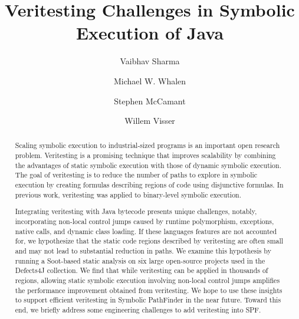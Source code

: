 \documentclass[sigconf]{acmart}
\begin{document}
\title{Veritesting Challenges in Symbolic Execution of Java}
\author{Vaibhav Sharma}

\author{Michael W. Whalen}

\author{Stephen McCamant}

\author{Willem Visser}
\renewcommand{\shortauthors}{V. Sharma et al.}


\begin{abstract}
Scaling symbolic execution to industrial-sized programs is an important open research problem.
%
Veritesting is a promising technique that improves scalability by combining the advantages of static symbolic execution with those of dynamic symbolic execution.  The goal of veritesting is to reduce the number of paths to explore in symbolic execution by creating formulas describing regions of code using disjunctive formulas.
%
In previous work, veritesting was applied to binary-level symbolic execution.

Integrating veritesting with Java bytecode presents unique challenges,
notably, incorporating non-local control jumps caused by runtime polymorphism, exceptions, native calls, and dynamic class loading.
%
If these languages features are not accounted for, we hypothesize that the static code regions described by veritesting are often small and may not lead to substantial reduction in paths.  We examine this hypothesis by running a Soot-based static analysis on six large open-source projects used in the Defects4J collection.
%
We find that while veritesting can be applied in thousands of regions, allowing static symbolic execution involving non-local control jumps amplifies the performance improvement obtained from veritesting.
%
We hope to use these insights to support efficient veritesting in Symbolic PathFinder in the near future.  Toward this end, we briefly address some engineering challenges to add veritesting into SPF.
\end{abstract}
\end{document}
